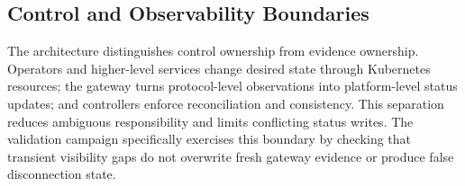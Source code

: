 \subsection{Control and Observability Boundaries}
The architecture distinguishes control ownership from evidence ownership. Operators and higher-level services change desired state through Kubernetes resources; the gateway turns protocol-level observations into platform-level status updates; and controllers enforce reconciliation and consistency. This separation reduces ambiguous responsibility and limits conflicting status writes. The validation campaign specifically exercises this boundary by checking that transient visibility gaps do not overwrite fresh gateway evidence or produce false disconnection state.
